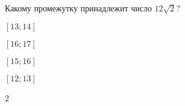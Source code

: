 \begin{ex}
	Какому промежутку принадлежит число $12\sqrt{2}$?
	
	\selectanswer
	\begin{enumcols}[columns=4]
		\item $[13;14]$
		\item $[16;17]$
		\item $[15;16]$
		\item $[12;13]$
	\end{enumcols}
	\begin{answer}
		2
	\end{answer}
\end{ex}
